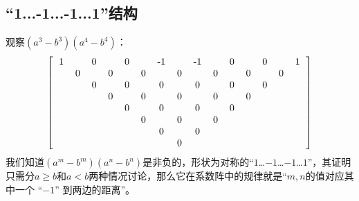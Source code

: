 \documentclass[UTF8]{ctexart}
\begin{document}
\subsection{“1...-1...-1...1”结构}
观察$ (a^{3}-b^{3})(a^{4}-b^{4})$：
\renewcommand*{\arraystretch}{1.732}\[
\left[\begin{matrix}
	\begin{tabular}{ccccccccccccccc}
		1& &0& &0& &-1& &-1& &0& &0& &1\\
		&0& &0& &0& &0& &0& &0& &0&\\
		& &0& &0& &0& &0& &0& &0& &\\
		& & &0& &0& &0& &0& &0& & &\\
		& & & &0& &0& &0& &0& & & &\\
		& & & & &0& &0& &0& & & & &\\
		& & & & & &0& &0& & & & & &\\
		& & & & & & &0& & & & & & &\\
	\end{tabular}
\end{matrix}\right]
\]
我们知道$ (a^{m}-b^{m})(a^{n}-b^{n})$是非负的，形状为对称的“$ 1 $…$ -1 $…$ -1 $…$ 1 $”，其证明只需分$ a\ge b $和$ a<b $两种情况讨论，那么它在系数阵中的规律就是“$ m,n $的值对应其中一个 “$-1$” 到两边的距离”。
\end{document}
